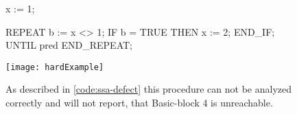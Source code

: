 \begin{figure}[h!]
	\begin{GenericCode}
	x := 1;
	
	REPEAT
		b := x <> 1;
		IF b = TRUE THEN
			x := 2;
		END_IF;    
	UNTIL pred
	END_REPEAT;
	\end{GenericCode}
	\centering
	\texttt{[image: hardExample]}
	\caption{As described in \ref{code:ssa-defect} this procedure can not be analyzed correctly and will not report, that Basic-block 4 is unreachable. }
	\label{code:hard example 1}
\end{figure}



